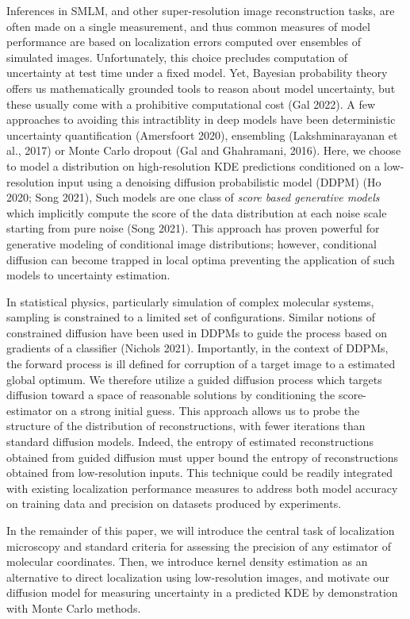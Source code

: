 \documentclass{article}
\begin{document}
Inferences in SMLM, and other super-resolution image reconstruction tasks, are often made on a single measurement, and thus common measures of model performance are based on localization errors computed over ensembles of simulated images. Unfortunately, this choice precludes computation of uncertainty at test time under a fixed model. Yet, Bayesian probability theory offers us mathematically grounded tools to reason about model uncertainty, but these usually come with a prohibitive computational cost (Gal 2022). A few approaches to avoiding this intractiblity in deep models have been deterministic uncertainty quantification (Amersfoort 2020), ensembling (Lakshminarayanan et al., 2017) or Monte Carlo dropout (Gal and Ghahramani, 2016). Here, we choose to model a distribution on high-resolution KDE predictions conditioned on a low-resolution input using a denoising diffusion probabilistic model (DDPM) (Ho 2020; Song 2021), Such models are one class of \emph{score based generative models} which implicitly compute the score of the data distribution at each noise scale starting from pure noise (Song 2021). This approach has proven powerful for generative modeling of conditional image distributions; however, conditional diffusion can become trapped in local optima preventing the application of such models to uncertainty estimation.

In statistical physics, particularly simulation of complex molecular systems, sampling is constrained to a limited set of configurations. Similar notions of constrained diffusion have been used in DDPMs to guide the process based on gradients of a classifier (Nichols 2021). Importantly, in the context of DDPMs, the forward process is ill defined for corruption of a target image to a estimated global optimum. We therefore utilize a guided diffusion process which targets diffusion toward a space of reasonable solutions by conditioning the score-estimator on a strong initial guess. This approach allows us to probe the structure of the distribution of reconstructions, with fewer iterations than standard diffusion models. Indeed, the entropy of estimated reconstructions obtained from guided diffusion must upper bound the entropy of reconstructions obtained from low-resolution inputs. This technique could be readily integrated with existing localization performance measures to address both model accuracy on training data and precision on datasets produced by experiments. 

In the remainder of this paper, we will introduce the central task of localization microscopy and standard criteria for assessing the precision of any estimator of molecular coordinates. Then, we introduce kernel density estimation as an alternative to direct localization using low-resolution images, and motivate our diffusion model for measuring uncertainty in a predicted KDE by demonstration with Monte Carlo methods. 
\end{document}
